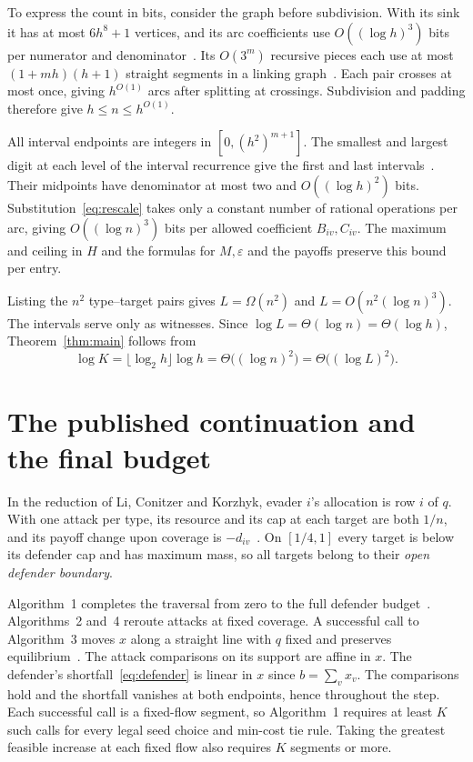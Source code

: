 \documentclass[11pt,letterpaper]{article}
\theoremstyle{definition}
\begin{document}
To express the count in bits, consider the graph before subdivision. With
its sink it has at most \(6h^8+1\) vertices, and its arc coefficients use
\(O((\log h)^3)\) bits per numerator and denominator~\cite[Lemma~14(i)--(ii)
and proof of Theorem~1]{GR}. Its \(O(3^m)\) recursive pieces each use at most
\((1+mh)(h+1)\) straight segments in a linking graph~\cite[\S\S2.1 and 3.3]{GR}.
Each pair crosses at most once, giving \(h^{O(1)}\) arcs after splitting at
crossings. Subdivision and padding therefore give \(h\le n\le h^{O(1)}\).

All interval endpoints are integers in \([0,(h^2)^{m+1}]\). The smallest
and largest digit at each level of the interval recurrence give the first
and last intervals~\cite[\S3.1]{GR}. Their midpoints have denominator at
most two and \(O((\log h)^2)\) bits. Substitution~\eqref{eq:rescale} takes
only a constant number of rational operations per arc, giving
\(O((\log n)^3)\) bits per allowed coefficient \(B_{iv},C_{iv}\). The
maximum and ceiling in \(H\) and the formulas for \(M,\varepsilon\) and
the payoffs preserve this bound per entry.

Listing the \(n^2\) type--target pairs gives \(L=\Omega(n^2)\) and
\(L=O(n^2(\log n)^3)\). The intervals serve only as witnesses. Since
\(\log L=\Theta(\log n)=\Theta(\log h)\), Theorem~\ref{thm:main} follows from
\[
  \log K=\lfloor\log_2 h\rfloor\log h
        =\Theta\bigl((\log n)^2\bigr)=\Theta\bigl((\log L)^2\bigr).
\]

\section{The published continuation and the final budget}

In the reduction of Li, Conitzer and Korzhyk, evader \(i\)'s allocation is
row \(i\) of \(q\). With one attack per type, its resource and its cap at
each target are both \(1/n\), and its payoff change upon coverage is
\(-d_{iv}\)~\cite[\S3.1]{LCK}. On \([1/4,1]\) every target is below its
defender cap and has maximum mass, so all targets belong to their
\emph{open defender boundary}.

Algorithm~1 completes the traversal from zero to the full defender
budget~\cite[Theorem~5]{LCK}. Algorithms~2 and~4 reroute attacks at
fixed coverage. A successful call to Algorithm~3 moves \(x\) along a
straight line with \(q\) fixed and preserves equilibrium~\cite[Lemma~4]{LCK}.
The attack comparisons on its support are affine in \(x\). The defender's
shortfall~\eqref{eq:defender} is linear in \(x\) since \(b=\sum_v x_v\).
The comparisons hold and the shortfall vanishes at both endpoints, hence
throughout the step. Each successful call is a fixed-flow segment, so
Algorithm~1 requires at least \(K\) such calls for every legal seed choice
and min-cost tie rule. Taking the greatest feasible increase at each fixed
flow also requires \(K\) segments or more.
\end{document}
